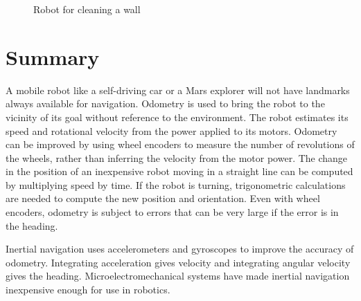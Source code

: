 \begin{figure}
\begin{center}
\end{center}
\caption{Robot for cleaning a wall}\label{fig.wallcleaning}
\end{figure}

\section{Summary}

A mobile robot like a self-driving car or a Mars explorer will not have landmarks always available for navigation. Odometry is used to bring the robot to the vicinity of its goal without reference to the environment. The robot estimates its speed and rotational velocity from the power applied to its motors. Odometry can be improved by using wheel encoders to measure the number of revolutions of the wheels, rather than inferring the velocity from the motor power. The change in the position of an inexpensive robot moving in a straight line can be computed by multiplying speed by time. If the robot is turning, trigonometric calculations are needed to compute the new position and orientation. Even with wheel encoders, odometry is subject to errors that can be very large if the error is in the heading.

Inertial navigation uses accelerometers and gyroscopes to improve the accuracy of odometry. Integrating acceleration gives velocity and integrating angular velocity gives the heading. Microelectromechanical systems have made inertial navigation inexpensive enough for use in robotics.

